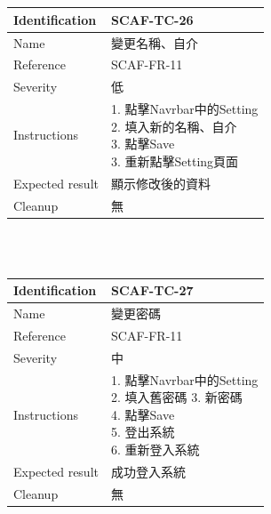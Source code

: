 \documentclass{report}
\begin{document}
\\
\newline
\\
\begin{tabularx}{\textwidth}{
  |p{}%
  |p{}|%
  }
  \hline
  \centering Identification &  SCAF-TC-26 \\
  \hline
  \centering Name & 變更名稱、自介 \\
  \hline
  \centering Reference & SCAF-FR-11 \\
  \hline
  \centering Severity & 低 \\
  \hline
  \centering Instructions & 
  \makecell[l]{
    1. 點擊Navrbar中的Setting \\
    2. 填入新的名稱、自介 \\
    3. 點擊Save \\
    3. 重新點擊Setting頁面
  }\\
  \hline
  \centering Expected result & 顯示修改後的資料 \\
  \hline
  \centering Cleanup & 無 \\
  \hline
\end{tabularx}
\\
\newline
\\
\begin{tabularx}{\textwidth}{
  |p{}%
  |p{}|%
  }
  \hline
  \centering Identification &  SCAF-TC-27 \\
  \hline
  \centering Name & 變更密碼 \\
  \hline
  \centering Reference & SCAF-FR-11 \\
  \hline
  \centering Severity & 中 \\
  \hline
  \centering Instructions & 
  \makecell[l]{
    1. 點擊Navrbar中的Setting \\
    2. 填入舊密碼
    3. 新密碼 \\
    4. 點擊Save \\
    5. 登出系統 \\
    6. 重新登入系統
  }\\
  \hline
  \centering Expected result & 成功登入系統 \\
  \hline
  \centering Cleanup & 無 \\
  \hline
\end{tabularx}
\\
\end{document}
